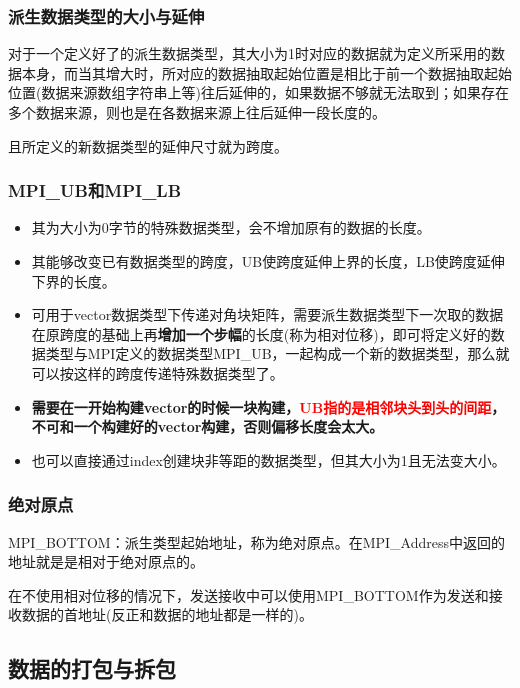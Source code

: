 \documentclass[UTF8]{article}%
\begin{document}
\subsubsection{派生数据类型的大小与延伸}

对于一个定义好了的派生数据类型，其大小为1时对应的数据就为定义所采用的数据本身，而当其增大时，所对应的数据抽取起始位置是相比于前一个数据抽取起始位置(数据来源数组字符串上等)往后延伸的，如果数据不够就无法取到；如果存在多个数据来源，则也是在各数据来源上往后延伸一段长度的。

且所定义的新数据类型的延伸尺寸就为跨度。

\subsubsection{MPI\_UB和MPI\_LB}

\begin{itemize}
    \item 其为大小为0字节的特殊数据类型，会不增加原有的数据的长度。
    \item 其能够改变已有数据类型的跨度，UB使跨度延伸上界的长度，LB使跨度延伸下界的长度。
    \item 可用于vector数据类型下传递对角块矩阵，需要派生数据类型下一次取的数据在原跨度的基础上再\textbf{增加一个步幅}的长度(称为相对位移)，即可将定义好的数据类型与MPI定义的数据类型MPI\_UB，一起构成一个新的数据类型，那么就可以按这样的跨度传递特殊数据类型了。
    \item \textbf{需要在一开始构建vector的时候一块构建，\textcolor{red}{UB指的是相邻块头到头的间距}，不可和一个构建好的vector构建，否则偏移长度会太大。}
    \item 也可以直接通过index创建块非等距的数据类型，但其大小为1且无法变大小。
\end{itemize}

\subsubsection{绝对原点}

MPI\_BOTTOM：派生类型起始地址，称为绝对原点。在MPI\_Address中返回的地址就是是相对于绝对原点的。

在不使用相对位移的情况下，发送接收中可以使用MPI\_BOTTOM作为发送和接收数据的首地址(反正和数据的地址都是一样的)。

\subsection{数据的打包与拆包}
\end{document}
